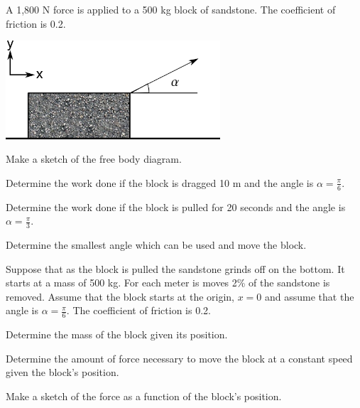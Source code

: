 \begin{problem}
\item A 1,800 N force is applied to a 500 kg block of sandstone. The
  coefficient of friction is 0.2.

  \includegraphics[width=8cm]{ink/week7/dragBlock}

  \begin{subproblem}
    \item Make a sketch of the free body diagram.
      \vspace{6em}
    \item Determine the work done if the block is dragged 10 m and the
      angle is $\alpha=\frac{\pi}{6}$.
      \vfill
    \item Determine the work done if the block is pulled for 20
      seconds and the angle is $\alpha=\frac{\pi}{3}$.  
      \vfill

    \item Determine the smallest angle which can be used and move the
      block.
      \vfill
  \end{subproblem}

  \clearpage

\item Suppose that as the block is pulled the sandstone grinds off on
  the bottom. It starts at a mass of 500 kg. For each meter is moves
  2\% of the sandstone is removed. Assume that the block starts at the
  origin, $x=0$ and assume that the angle is
  $\alpha=\frac{\pi}{6}$. The coefficient of friction is 0.2.

  \begin{subproblem}
  \item Determine the mass of the block given its position.
    \vfill
  \item Determine the amount of force necessary to move the block at a
    constant speed given the block's position.
    \vfill
  \item Make a sketch of the force as a function of the block's
    position.

    \vfill
  \end{subproblem}

\end{problem}

